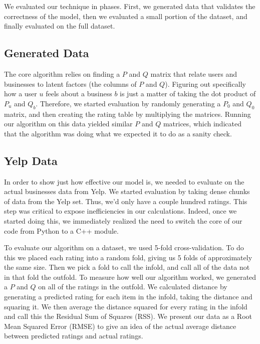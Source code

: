 We evaluated our technique in phases. First, we generated data that
validates the correctness of the model, then we evaluated a small portion of
the dataset, and finally evaluated on the full dataset.

\subsection{Generated Data}
The core algorithm relies on finding a $P$ and $Q$ matrix that relate users and
businesses to latent factors (the columns of $P$ and $Q$).  Figuring out
specifically how a user $u$ feels about a business $b$ is just a matter of
taking the dot product of $P_u$ and $Q_b$.  Therefore, we started evaluation by
randomly generating a $P_{0}$ and $Q_{0}$ matrix, and then creating the rating
table by multiplying the matrices. Running our algorithm on this data yielded
similar $P$ and $Q$ matrices, which indicated that the algorithm was doing what
we expected it to do as a sanity check.

\subsection{Yelp Data}
In order to show just how effective our model is, we needed to evaluate on the
actual businesses data from Yelp. We started evaluation by taking dense chunks
of data from the Yelp set. Thus, we'd only have a couple hundred ratings.  This
step was critical to expose inefficiencies in our calculations. Indeed, once we
started doing this, we immediately realized the need to switch the core of our
code from Python to a C++ module.

To evaluate our algorithm on a dataset, we used 5-fold cross-validation. To do
this we placed each rating into a random fold, giving us 5 folds of
approximately the same size. Then we pick a fold to call the infold, and call
all of the data not in that fold the outfold. To measure how well our algorithm
worked, we generated a $P$ and $Q$ on all of the ratings in the outfold. We
calculated distance by generating a predicted rating for each item in the
infold, taking the distance and squaring it. We then average the distance
squared for every rating in the infold and call this the Residual Sum of
Squares (RSS). We present our data as a Root Mean Squared Error (RMSE) to give
an idea of the actual average distance between predicted ratings and actual
ratings.

